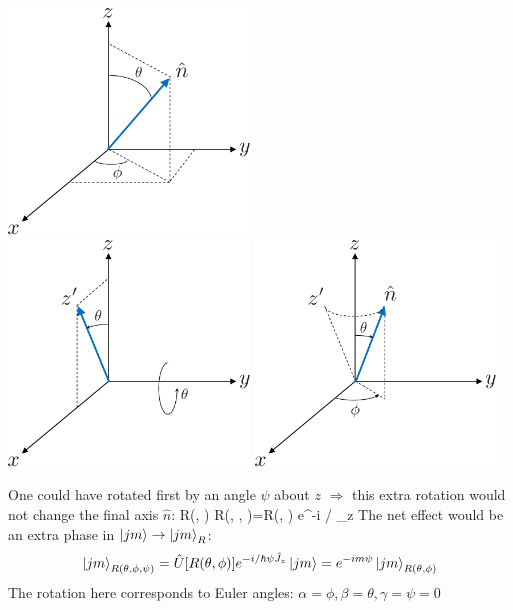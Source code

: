 \documentclass[12pt]{article}
\begin{document}
\begin{center}
\includegraphics[width=0.48\textwidth]{Figures/rotation0-crop.pdf}\\[1ex]
\includegraphics[width=0.48\textwidth]{Figures/rotation1-crop.pdf}
\includegraphics[width=0.48\textwidth]{Figures/rotation2-crop.pdf}
\end{center}

One could have rotated first by an angle \(\psi\) about \(z\)
\(\Rightarrow\) this extra rotation would not change the final
axis $\hat{n}$:
\be
R(\theta, \phi) \rightarrow R(\theta, \phi, \psi)=R(\theta, \phi) e^{-i / \hbar \psi {}_{z}}
\ee
The net effect would be an extra phase in $\ket{jm} \to \ket{jm}_R$:
\[
\ket{jm}_{R(\theta, \phi, \psi)} = 
\hat{U}[R(\theta, \phi)] e^{-i / \hbar \psi \hat{J}_{z}} \ket{jm} = 
e^{-im\psi} \ket{jm}_{R(\theta, \phi)}
\]
The rotation here corresponds to Euler angles: \(\alpha=\phi, \beta=\theta, \gamma=\psi=0\)
\end{document}
